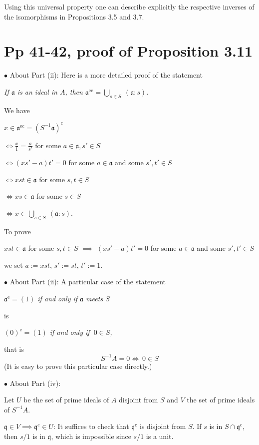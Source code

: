 \documentclass[12pt]{article}
\newcommand{\oo}{\operatorname}
\newcommand{\mf}{\mathfrak}
\newcommand{\bu}{\bullet}
\newcommand{\ds}{\displaystyle}
\begin{document}
Using this universal property one can describe explicitly the respective inverses of the isomorphisms in Propositions 3.5 and 3.7.


\section{Pp 41-42, proof of Proposition 3.11}%

$\bu$ About Part (ii): Here is a more detailed proof of the statement 

\emph{If $\mf a$ is an ideal in $A$, then $\mf a^{\oo{ec}}=\bigcup_{s\in S}\ (\mf a:s)$}.

We have 

$x\in\mf a^{\oo{ec}}=(S^{-1}\mf a)^{\oo c}$

$\ds\iff\frac{x}{1}=\frac{a}{s'}$ for some $a\in\mf a,s'\in S$ 

$\iff(xs'-a)t'=0$ for some $a\in\mf a$ and some $s',t'\in S$ 

$\iff xst\in\mf a$ for some $s,t\in S$

$\iff xs\in\mf a$ for some $s\in S$

$\iff x\in\bigcup_{s\in S}\ (\mf a:s)$.

To prove 

$xst\in\mf a$ for some $s,t\in S$ $\implies$ $(xs'-a)t'=0$ for some $a\in\mf a$ and some $s',t'\in S$

we set $a:=xst$, $s':=st$, $t':=1$.%

$\bu$ About Part (ii): A particular case of the statement 

\emph{$\mf a^{\oo e}=(1)$ if and only if $\mf a$ meets $S$}

is 

\emph{$(0)^{\oo e}=(1)$ if and only if $\ 0\in S$,}

that is 
\begin{equation}\label{s-1a}
S^{-1}A=0\iff\ 0\in S
\end{equation}
(It is easy to prove this particular case directly.)

$\bu$ About Part (iv):

Let $U$ be the set of prime ideals of $A$ disjoint from $S$ and $V$ the set of prime ideals of $S^{-1}A$. 

$\mf q\in V\implies\mf q^{\oo c}\in U$: It suffices to check that $\mf q^{\oo c}$ is disjoint from $S$. If $s$ is in $S\cap\mf q^{\oo c}$, then $s/1$ is in $\mf q$, which is impossible since $s/1$ is a unit.
\end{document}
